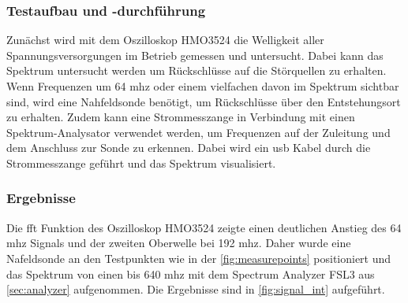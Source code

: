 \subsubsection*{Testaufbau und -durchführung}
Zunächst wird mit dem Oszilloskop HMO3524 die Welligkeit aller Spannungsversorgungen im Betrieb gemessen und untersucht. Dabei kann das Spektrum untersucht werden um Rückschlüsse auf die Störquellen zu erhalten. Wenn Frequenzen um 64 \ac{mhz} oder einem vielfachen davon im Spektrum sichtbar sind, wird eine Nahfeldsonde benötigt, um Rückschlüsse über den Entstehungsort zu erhalten. Zudem kann eine Strommesszange in Verbindung mit einen Spektrum-Analysator verwendet werden, um Frequenzen auf der Zuleitung und dem Anschluss zur Sonde zu erkennen. Dabei wird ein \ac{usb} Kabel durch die Strommesszange geführt und das Spektrum visualisiert.
\subsubsection*{Ergebnisse}
Die \ac{fft} Funktion des Oszilloskop HMO3524 zeigte einen deutlichen Anstieg des 64 \ac{mhz} Signals und der zweiten Oberwelle bei 192 \ac{mhz}. Daher wurde eine Nafeldsonde an den Testpunkten wie in der \autoref{fig:measurepoints} positioniert und das Spektrum von einen bis 640 \ac{mhz} mit dem Spectrum Analyzer FSL3 aus \autoref{sec:analyzer} aufgenommen. Die Ergebnisse sind in \autoref{fig:signal_int} aufgeführt.
